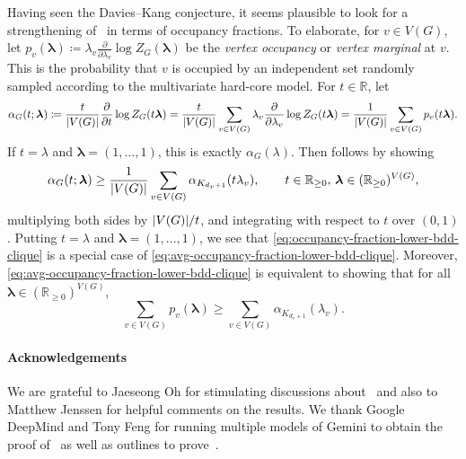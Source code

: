 \documentclass{article}
\numberwithin{equation}{section}
\theoremstyle{plain}
\theoremstyle{definition}
\theoremstyle{remark} %
\DeclarePairedDelimiter{\abs}{\lvert}{\rvert}
\newcommand{\defeq}{\coloneqq}
\newcommand{\RR}{\mathbb{R}}
\newcommand{\blambda}{\bm{\lambda}}
\begin{document}
Having seen the Davies--Kang conjecture, it seems plausible to look for a strengthening of~ in terms of occupancy fractions.
To elaborate, for \(v\in V(G)\), let \(p_v(\blambda)\defeq \lambda_v \frac{\partial}{\partial{\lambda_v}} \log Z_G(\blambda)\) be the \emph{vertex occupancy} or \emph{vertex marginal} at \(v\). This is the probability that \(v\) is occupied by an independent set randomly sampled according to the multivariate hard-core model.
For \(t\in\mathbb{R}\), let
\[
    \alpha_G(t;\blambda)
    \defeq \frac{t}{\abs{V(G)}} \frac{\partial}{\partial t} \log Z_G(t\blambda)
    = \frac{t}{\abs{V(G)}} \sum_{v\in V(G)} \lambda_v \frac{\partial}{\partial\lambda_v} \log Z_G(t\blambda)
    = \frac{1}{\abs{V(G)}} \sum_{v\in V(G)} p_v(t\blambda).
\]
If \(t=\lambda\) and \(\blambda=(1,\dots,1)\), this is exactly \(\alpha_G(\lambda)\). Then  follows by showing
\begin{equation}\label{eq:avg-occupancy-fraction-lower-bdd-clique}
    \alpha_G(t;\blambda)
    \ge \frac{1}{\abs{V(G)}} \sum_{v\in V(G)} \alpha_{K_{d_v+1}}(t\lambda_v),
    \qquad t\in \RR_{\ge0},\, \blambda\in(\RR_{\ge0})^{V(G)},
\end{equation}
multiplying both sides by \(\abs{V(G)}/t\), and integrating with respect to \(t\) over \((0,1)\). Putting \(t=\lambda\) and \(\blambda=(1,\dots,1)\), we see that \eqref{eq:occupancy-fraction-lower-bdd-clique} is a special case of \eqref{eq:avg-occupancy-fraction-lower-bdd-clique}. Moreover, \eqref{eq:avg-occupancy-fraction-lower-bdd-clique} is equivalent to showing that for all \(\blambda\in(\RR_{\ge0})^{V(G)}\),
\[
    \sum_{v\in V(G)} p_v(\blambda) \ge \sum_{v\in V(G)} \alpha_{K_{d_v+1}}(\lambda_v).
\]


\paragraph{Acknowledgements} We are grateful to Jaeseong Oh for stimulating discussions about~ and also to Matthew Jenssen for helpful comments on the results. We thank Google DeepMind and Tony Feng for running multiple models of Gemini to obtain the proof of~ as well as outlines to prove~. 


\printbibliography
\end{document}
